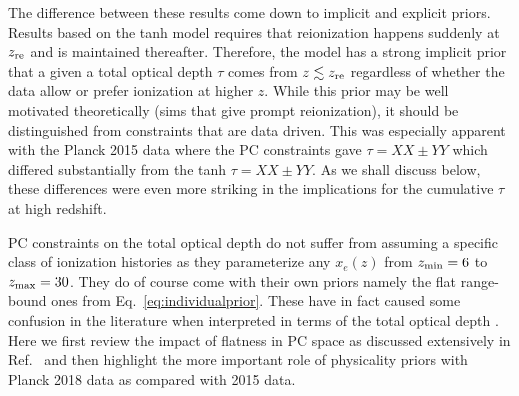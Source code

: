 \documentclass[prd,twocolumn,amsmath,amssymb,floatfix,superscriptaddress,nofootinbib]{revtex4-1}
\begin{document}
The difference between these results come down to implicit and explicit priors.   Results based on the tanh model requires that reionization happens suddenly at $z_{\rm re}$ and is maintained thereafter.   Therefore, the model has a strong implicit prior that a given a total optical depth $\tau$ comes from $z\lesssim z_{\rm re}$ regardless of whether the data allow or prefer
ionization at higher $z$.  While this prior may be well motivated
theoretically \cite{XX} (sims that give prompt reionization), it should be distinguished from constraints that are data driven.  
This was especially apparent with the Planck 2015 data where
the PC constraints gave $\tau=XX\pm YY$ which differed substantially from the tanh $\tau=XX\pm YY$.  As we shall discuss
below, these differences were even more striking in the implications for the cumulative $\tau$ at high redshift.

PC constraints on the total optical depth do not suffer from assuming a specific class of ionization histories as they parameterize any $x_e(z)$ from $z_{\rm min}=6$ to $z_{\rm max}=30$.
They do of course come with their own priors namely the flat
range-bound ones from Eq.~\eqref{eq:individualprior}.
These have in fact caused some confusion in the literature when interpreted in terms of the total optical depth \cite{Millea:2018bko}.  Here we first review the impact of flatness in PC space as discussed extensively in Ref.~\cite{Heinrich:2018btc} and then highlight the more important role of physicality priors with Planck 2018 data as compared with
2015 data.
\end{document}
